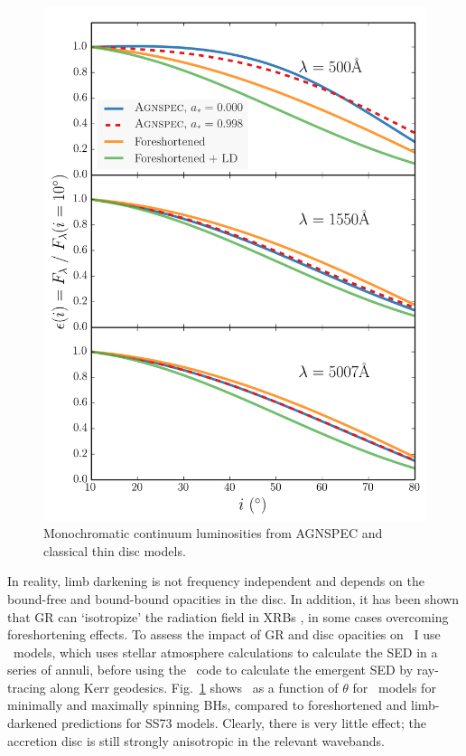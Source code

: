 \begin{figure}
\centering
\includegraphics[width=1.0\textwidth]{figures/ewpaper/agnspec.png}
\caption
{
Monochromatic continuum luminosities from AGNSPEC and classical thin disc
models.
}
\label{fig:agnspec_disc}
\end{figure} 


\noindent
In reality, limb darkening is not frequency independent and 
depends on the bound-free and bound-bound opacities in the disc.
In addition, it has been shown that GR can `isotropize' the radiation
field in XRBs \citep{zhang1997,munozdarias2013}, in some cases overcoming
foreshortening effects. To assess the impact of GR and disc opacities
on \ept\ I use \agn\ models, which uses stellar atmosphere 
calculations to calculate the 
SED in a series of annuli, before using the \kerrtrans\ code 
to calculate the emergent SED by ray-tracing along Kerr geodesics.
Fig.~\ref{fig:agnspec_disc} shows \ept\ as a function of 
$\theta$ for \agn\ models for minimally and maximally spinning BHs,
compared to foreshortened and limb-darkened predictions for SS73 models.
Clearly, there is very little effect; 
the accretion disc is still strongly anisotropic in the relevant wavebands.

